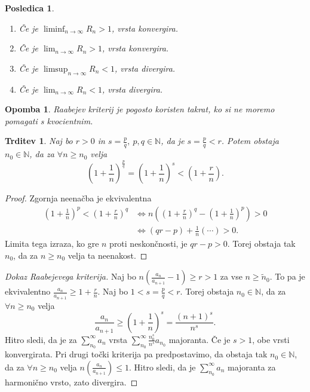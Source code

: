 \documentclass[10pt, a4paper]{article}
\newtheorem{posledica}[izr]{Posledica}
\newtheorem{trditev}[izr]{Trditev}
\newtheorem*{opomba}{Opomba}
\newenvironment{noticeC}{%
  \tcolorbox[%
  notitle,
  empty,
  enhanced,  %
  breakable,
  coltext=black, 
  fontupper=\rmfamily,
  noparskip,
  sharp corners,
  boxrule=-1pt,  %
  frame hidden,
  left=7pt,  %
  right=7pt,
  top=5pt,
  bottom=5pt,
  before skip=2.5ex plus 2pt,
  after skip=2.5ex plus 2pt,
  overlay unbroken and last={%
  },
  ]}
{\endtcolorbox}
\newenvironment{dokaz}%
  {\begin{noticeC}\begin{proof}}%
  {\end{proof}\end{noticeC}}
\newcommand{\N}{\mathbb {N}}
\begin{document}
\begin{posledica}
    \begin{enumerate}
        \item Če je $\liminf_{n \to \infty} R_n > 1$, vrsta konvergira.
        \item Če je $\lim_{n \to \infty} R_n > 1$, vrsta konvergira.
        \item Če je $\limsup_{n \to \infty} R_n < 1$, vrsta divergira.
        \item Če je $\lim_{n \to \infty} R_n < 1$, vrsta divergira.
    \end{enumerate}
\end{posledica}

\begin{opomba}
    Raabejev kriterij je pogosto koristen takrat, ko si ne moremo pomagati s kvocientnim.
\end{opomba}

\begin{trditev}
    Naj bo $r > 0$ in $s = \frac{p}{q},\ p,q \in \N$, da je $s = \frac{p}{q} < r$.
    Potem obstaja $n_0 \in \N$, da za $\forall n \geq n_0$ velja $$\left(1 + \frac{1}{n}\right)^{\frac{p}{q}} = \left(1 + \frac{1}{n}\right)^s < \left(1 + \frac{r}{n}\right).$$
\end{trditev}

\begin{dokaz}
    Zgornja neenačba je ekvivalentna
    \begin{align*}
        \left(1 + \frac{1}{n}\right)^{p} < \left(1 + \frac{r}{n}\right)^q &\iff n \left( \left(1 + \frac{r}{n}\right)^q - \left(1 + \frac{1}{n}\right)^{p}\right) > 0\\
        &\iff (qr - p) + \frac{1}{n} (\cdots)> 0 .
    \end{align*}
    Limita tega izraza, ko gre $n$ proti neskončnosti, je $qr - p > 0$.
    Torej obstaja tak $n_0$, da za $n \geq n_0$ velja ta neenakost.
\end{dokaz}

\begin{dokaz}[Dokaz Raabejevega kriterija]
    Naj bo $n \left(\frac{a_n}{a_{n+1}} - 1 \right) \geq r > 1$ za vse $n \geq \tilde{n}_0$.
    To pa je ekvivalentno $\frac{a_n}{a_{n+1}} \geq 1 + \frac{r}{n}$.
    Naj bo $1 < s = \frac{p}{q} < r$.
    Torej obstaja $n_0 \in \N$, da za $\forall n \geq n_0$ velja
    $$\frac{a_n}{a_{n+1}} \geq (1 + \frac{1}{n})^s = \frac{(n+1)^s}{n^s}.$$
    Hitro sledi, da je za $\sum_{n_0} ^\infty a_n$ vrsta $\sum_{n_0} ^\infty \frac{n_0 ^s}{n^s} a_{n_0}$ majoranta.
    Če je $s > 1$, obe vrsti konvergirata.
    Pri drugi točki kriterija pa predpostavimo, da obstaja tak $n_0 \in \N$, da za $\forall n \geq n_0$ velja $n \left( \frac{a_n}{a_{n+1}} \right) \leq 1.$
    Hitro sledi, da je $\sum_{n_0} ^\infty a_n$ majoranta za harmonično vrsto, zato divergira.
\end{dokaz}
\end{document}
